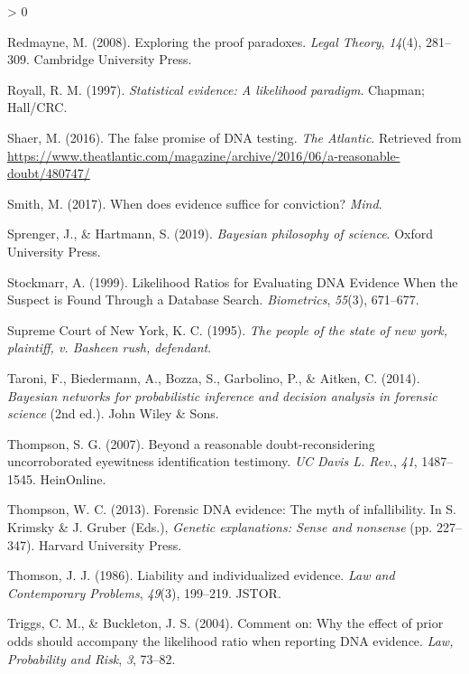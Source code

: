 \documentclass[
  10pt,
  dvipsnames,enabledeprecatedfontcommands]{scrartcl}
\newlength{\cslhangindent}
\newenvironment{CSLReferences}[2] %
 {%
  \setlength{\parindent}{0pt}
  \ifodd #1 \everypar{\setlength{\hangindent}{\cslhangindent}}\ignorespaces\fi
  \ifnum #2 > 0
  \setlength{\parskip}{#2\baselineskip}
  \fi
 }%
 {}
\begin{document}
\begin{CSLReferences}{1}{0}
\leavevmode\hypertarget{ref-redmayne2008exploring}{}%
Redmayne, M. (2008). Exploring the proof paradoxes. \emph{Legal Theory},
\emph{14}(4), 281--309. Cambridge University Press.

\leavevmode\hypertarget{ref-Royall1997}{}%
Royall, R. M. (1997). \emph{Statistical evidence: A likelihood
paradigm}. Chapman; Hall/CRC.

\leavevmode\hypertarget{ref-Shaer2016False}{}%
Shaer, M. (2016). The false promise of DNA testing. \emph{The Atlantic}.
Retrieved from
\url{https://www.theatlantic.com/magazine/archive/2016/06/a-reasonable-doubt/480747/}

\leavevmode\hypertarget{ref-Smith2018evidence}{}%
Smith, M. (2017). When does evidence suffice for conviction?
\emph{Mind}.

\leavevmode\hypertarget{ref-sprenger2019bayesian}{}%
Sprenger, J., \& Hartmann, S. (2019). \emph{Bayesian philosophy of
science}. Oxford University Press.

\leavevmode\hypertarget{ref-stockmarr1999LikelihoodRatiosEvaluating}{}%
Stockmarr, A. (1999). Likelihood {Ratios} for {Evaluating DNA Evidence
When} the {Suspect} is {Found Through} a {Database Search}.
\emph{Biometrics}, \emph{55}(3), 671--677.

\leavevmode\hypertarget{ref-Rush1995}{}%
Supreme Court of New York, K. C. (1995). \emph{The people of the state
of new york, plaintiff, v. Basheen rush, defendant}.

\leavevmode\hypertarget{ref-taroni2006bayesian}{}%
Taroni, F., Biedermann, A., Bozza, S., Garbolino, P., \& Aitken, C.
(2014). \emph{Bayesian networks for probabilistic inference and decision
analysis in forensic science} (2nd ed.). John Wiley \& Sons.

\leavevmode\hypertarget{ref-thompson2007beyond}{}%
Thompson, S. G. (2007). Beyond a reasonable doubt-reconsidering
uncorroborated eyewitness identification testimony. \emph{UC Davis L.
Rev.}, \emph{41}, 1487--1545. HeinOnline.

\leavevmode\hypertarget{ref-thompson2012forensic}{}%
Thompson, W. C. (2013). Forensic DNA evidence: The myth of
infallibility. In S. Krimsky \& J. Gruber (Eds.), \emph{Genetic
explanations: Sense and nonsense} (pp. 227--347). Harvard University
Press.

\leavevmode\hypertarget{ref-thomson1986liability}{}%
Thomson, J. J. (1986). Liability and individualized evidence. \emph{Law
and Contemporary Problems}, \emph{49}(3), 199--219. JSTOR.

\leavevmode\hypertarget{ref-triggsCommentWhyEffect}{}%
Triggs, C. M., \& Buckleton, J. S. (2004). Comment on: {Why} the effect
of prior odds should accompany the likelihood ratio when reporting {DNA}
evidence. \emph{Law, Probability and Risk}, \emph{3}, 73--82.


\end{CSLReferences}
\end{document}
